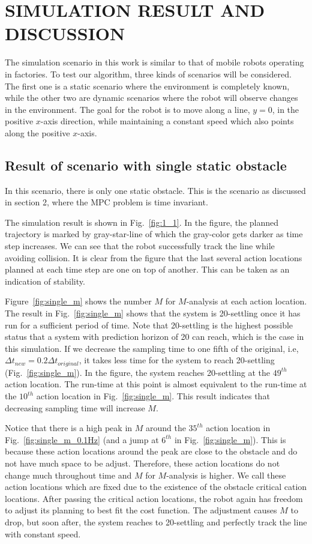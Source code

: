 \documentclass[letterpaper, 10 pt, conference]{ieeeconf}  %
\begin{document}
\section{SIMULATION RESULT AND DISCUSSION}
The simulation scenario in this work is similar to that of mobile robots operating in factories. To test our algorithm, three kinds of scenarios will be considered. The first one is a static scenario where the environment  is completely known, while the other two are dynamic scenarios where the robot will observe changes in the environment.
The goal for the robot is to move along a line, $y=0$, in the positive $x$-axis direction, while maintaining a constant speed which also points along the positive $x$-axis. 


\subsection{Result of scenario with single static obstacle}
In this scenario, there is only one static obstacle. This is the scenario as discussed in section 2, where the MPC problem is time invariant. 

The simulation result is shown in Fig.~\ref{fig:1_1}. In the figure, the planned trajectory is marked by gray-star-line of which the gray-color gets darker as time step increases. We can see that the robot successfully track the line while avoiding collision. It is clear from the figure that the last several action locations planned at each time step are one on top of another. This can be taken as an indication of stability. 


Figure~\ref{fig:single_m} shows the number $M$ for $M$-analysis at each action location. The result in Fig.~\ref{fig:single_m} shows that the system is 20-settling once it has run for a sufficient period of time. Note that 20-settling is the highest possible status that a system with prediction horizon of 20 can reach, which is the case in this simulation. If we decrease the sampling time to one fifth of the original, i.e, $\Delta t_{new}=0.2\Delta t_{original}$, it takes less time for the system to reach 20-settling (Fig.~\ref{fig:single_m}). In the figure, the system reaches 20-settling at the $49^{th}$ action location. The run-time at this point is almost equivalent to the run-time at the $10^{th}$ action location in Fig.~\ref{fig:single_m}. This result indicates that decreasing sampling time will increase $M$.

Notice that there is a high peak in $M$ around the $35^{th}$ action location in Fig.~\ref{fig:single_m_0.1Hz} (and a jump at $6^{th}$ in Fig.~\ref{fig:single_m}). This is because these action locations around the peak are close to the obstacle and do not have much space to be adjust. Therefore, these action locations do not change much throughout time and $M$ for $M$-analysis is higher. We call these action locations which are fixed due to the existence of the obstacle critical cation locations. After passing the critical action locations, the robot again has freedom to adjust its planning to best fit the cost function. The adjustment causes $M$ to drop, but soon after, the system reaches to 20-settling and perfectly track the line with constant speed. 
\end{document}
